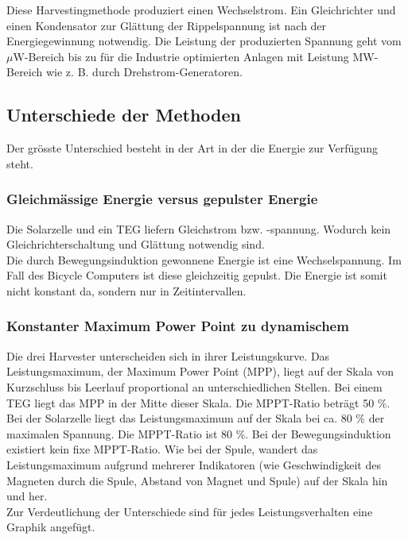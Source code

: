 Diese Harvestingmethode produziert einen Wechselstrom. Ein Gleichrichter und einen Kondensator zur Glättung der Rippelspannung ist nach der Energiegewinnung notwendig. Die Leistung der produzierten Spannung geht vom $\mu$W-Bereich bis zu für die Industrie optimierten Anlagen mit Leistung MW-Bereich wie z. B. durch Drehstrom-Generatoren.\\



\subsection{Unterschiede der Methoden}\label{harv_diff} 

Der grösste Unterschied besteht in der Art in der die Energie zur Verfügung steht. 

\subsubsection{Gleichmässige Energie versus gepulster Energie}
Die Solarzelle und ein TEG liefern Gleichstrom bzw. -spannung. Wodurch kein Gleichrichterschaltung und Glättung notwendig sind.\\

Die durch Bewegungsinduktion gewonnene Energie ist eine Wechselspannung. Im Fall des Bicycle Computers ist diese gleichzeitig gepulst. Die Energie ist somit nicht konstant da, sondern nur in Zeitintervallen.\\

\subsubsection{Konstanter Maximum Power Point zu dynamischem}
Die drei Harvester unterscheiden sich in ihrer Leistungskurve. Das Leistungsmaximum, der Maximum Power Point (MPP), liegt auf der Skala von Kurzschluss bis Leerlauf proportional an unterschiedlichen Stellen.  Bei einem TEG liegt das MPP in der Mitte dieser Skala. Die MPPT-Ratio beträgt 50 \%. Bei der Solarzelle liegt das Leistungsmaximum auf der Skala bei ca. 80 \% der maximalen Spannung. Die MPPT-Ratio ist 80 \%.  Bei der Bewegungsinduktion existiert kein fixe MPPT-Ratio. Wie bei der Spule, wandert das Leistungsmaximum aufgrund mehrerer Indikatoren (wie Geschwindigkeit des Magneten durch die Spule, Abstand von Magnet und Spule) auf der Skala hin und her.\\

Zur Verdeutlichung der Unterschiede sind für jedes Leistungsverhalten eine Graphik angefügt.\\

